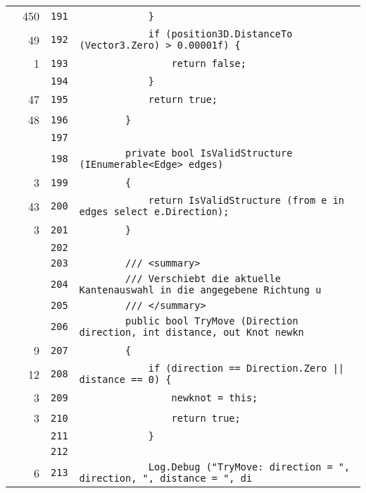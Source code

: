 \documentclass[a4paper,10pt]{article}
\begin{document}
\begin{longtable}[l]{lrrl}
\cellcolor{green} & 450 & \verb~191~ & \verb~            }~\\
\cellcolor{green} & 49 & \verb~192~ & \verb~            if (position3D.DistanceTo (Vector3.Zero) > 0.00001f) {~\\
\cellcolor{green} & 1 & \verb~193~ & \verb~                return false;~\\
\cellcolor{gray} &  & \verb~194~ & \verb~            }~\\
\cellcolor{green} & 47 & \verb~195~ & \verb~            return true;~\\
\cellcolor{green} & 48 & \verb~196~ & \verb~        }~\\
\cellcolor{gray} &  & \verb~197~ & \verb~~\\
\cellcolor{gray} &  & \verb~198~ & \verb~        private bool IsValidStructure (IEnumerable<Edge> edges)~\\
\cellcolor{green} & 3 & \verb~199~ & \verb~        {~\\
\cellcolor{green} & 43 & \verb~200~ & \verb~            return IsValidStructure (from e in edges select e.Direction);~\\
\cellcolor{green} & 3 & \verb~201~ & \verb~        }~\\
\cellcolor{gray} &  & \verb~202~ & \verb~~\\
\cellcolor{gray} &  & \verb~203~ & \verb~        /// <summary>~\\
\cellcolor{gray} &  & \verb~204~ & \verb~        /// Verschiebt die aktuelle Kantenauswahl in die angegebene Richtung u~\\
\cellcolor{gray} &  & \verb~205~ & \verb~        /// </summary>~\\
\cellcolor{gray} &  & \verb~206~ & \verb~        public bool TryMove (Direction direction, int distance, out Knot newkn~\\
\cellcolor{green} & 9 & \verb~207~ & \verb~        {~\\
\cellcolor{green} & 12 & \verb~208~ & \verb~            if (direction == Direction.Zero || distance == 0) {~\\
\cellcolor{green} & 3 & \verb~209~ & \verb~                newknot = this;~\\
\cellcolor{green} & 3 & \verb~210~ & \verb~                return true;~\\
\cellcolor{gray} &  & \verb~211~ & \verb~            }~\\
\cellcolor{gray} &  & \verb~212~ & \verb~~\\
\cellcolor{green} & 6 & \verb~213~ & \verb~            Log.Debug ("TryMove: direction = ", direction, ", distance = ", di~\\

\end{longtable}
\end{document}
